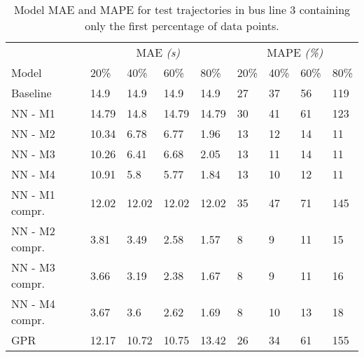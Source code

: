 \begin{table}[H]
  \centering
  \caption{Model MAE and MAPE for test trajectories in bus line 3 containing only the first percentage of data points.}
  \label{tbl:models-mae-and-mape-203}
  \begin{tabular}{l | l | l | l | l || l | l | l | l }
    & \multicolumn{4}{c}{MAE \textit{(s)}} & \multicolumn{4}{c}{MAPE \textit{(\%)}} \\
    Model      & 20\% & 40\% & 60\% & 80\% & 20\% & 40\% & 60\% & 80\% \\
    \hline
    Baseline & 14.9 & 14.9 & 14.9 & 14.9  & 27 & 37 & 56 & 119 \\
    NN - M1        & 14.79& 14.8& 14.79& 14.79& 30& 41& 61& 123 \\
    NN - M2        & 10.34& 6.78& 6.77& 1.96& 13& 12& 14& 11 \\
    NN - M3       & 10.26& 6.41& 6.68& 2.05& 13& 11& 14& 11\\
    NN - M4        & 10.91& 5.8& 5.77& 1.84& 13& 10& 12& 11 \\
    NN - M1 compr.       & 12.02& 12.02& 12.02& 12.02& 35& 47& 71& 145 \\
    NN - M2 compr.       & 3.81& 3.49& 2.58& 1.57& 8& 9& 11& 15 \\
    NN - M3 compr.       & 3.66& 3.19& 2.38& 1.67& 8& 9& 11& 16 \\
    NN - M4 compr.       & 3.67& 3.6& 2.62& 1.69& 8 & 10& 13& 18 \\
    GPR        &  12.17 & 10.72 & 10.75 & 13.42 & 26 &  34 & 61 &  155  \\
  \end{tabular}
\end{table}

